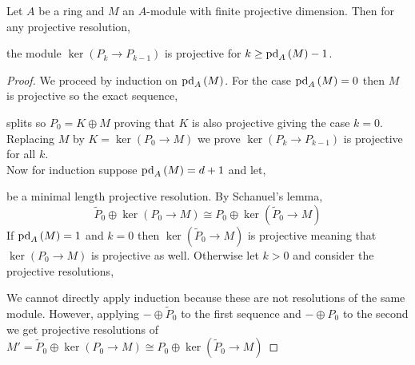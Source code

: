 \documentclass[12pt]{article}
\begin{document}
\begin{lemma}
Let $A$ be a ring and $M$ an $A$-module with finite projective dimension. Then for any projective resolution,
\begin{center}
\end{center}
the module $\ker{(P_k \to P_{k-1})}$ is projective for $k \ge \mathrm{pd}_{A} \left( M \right) - 1$.
\end{lemma}

\begin{proof}
We proceed by induction on $\mathrm{pd}_{A} \left( M \right)$. For the case $\mathrm{pd}_{A} \left( M \right) = 0$ then $M$ is projective so the exact sequence,
\begin{center}
\end{center}
splits so $P_0 = K \oplus M$ proving that $K$ is also projective giving the case $k = 0$. Replacing $M$ by $K = \ker{(P_0 \to M)}$ we prove $\ker{(P_k \to P_{k-1})}$ is projective for all $k$.
\bigskip\\
Now for induction suppose $\mathrm{pd}_{A} \left( M \right) = d + 1$ and let,
\begin{center}
\end{center}
be a minimal length projective resolution. By Schanuel's lemma,
\[ \tilde{P}_0 \oplus \ker{(P_0 \to M)} \cong P_0 \oplus \ker{(\tilde{P}_0 \to M)} \]
If $\mathrm{pd}_{A} \left( M \right) = 1$ and $k = 0$ then $\ker{(\tilde{P}_0 \to M)}$ is projective meaning that $\ker{(P_0 \to M)}$ is projective as well. Otherwise let $k > 0$ and consider the projective resolutions,
\begin{center}
\end{center}
We cannot directly apply induction because these are not resolutions of the same module. However, applying $- \oplus \tilde{P}_0$ to the first sequence and $- \oplus P_0$ to the second we get projective resolutions of $M' = \tilde{P}_0 \oplus \ker{(P_0 \to M)} \cong P_0 \oplus \ker{(\tilde{P}_0 \to M)}$

\end{proof}
\end{document}
